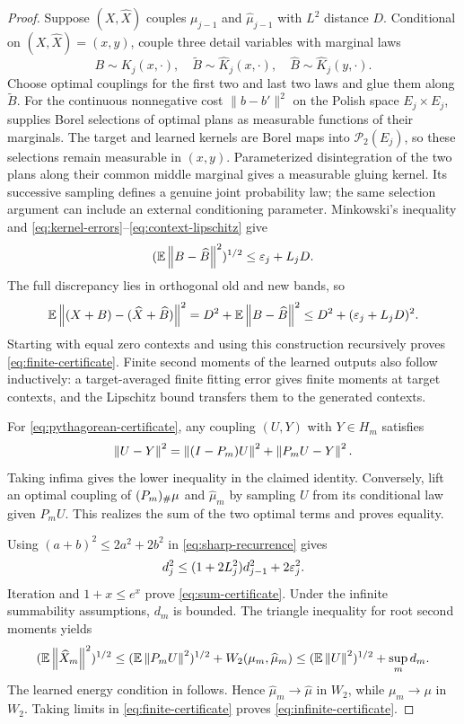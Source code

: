 \begin{proof}
Suppose $(X,\widehat X)$ couples $\mu_{j-1}$ and $\widehat\mu_{j-1}$ with $L^2$ distance $D$. Conditional on $(X,\widehat X)=(x,y)$, couple three detail variables with marginal laws
\[
 B\sim K_j(x,\cdot),\quad
 \widetilde B\sim\widehat K_j(x,\cdot),\quad
 \widehat B\sim\widehat K_j(y,\cdot).
\]
Choose optimal couplings for the first two and last two laws and glue them along $\widetilde B$. For the continuous nonnegative cost $\|b-b'\|^2$ on the Polish space $E_j\times E_j$, \citet[Corollary~5.22]{villani2009} supplies Borel selections of optimal plans as measurable functions of their marginals. The target and learned kernels are Borel maps into $\mathcal P_2(E_j)$, so these selections remain measurable in $(x,y)$. Parameterized disintegration of the two plans along their common middle marginal gives a measurable gluing kernel. Its successive sampling defines a genuine joint probability law; the same selection argument can include an external conditioning parameter. Minkowski's inequality and \eqref{eq:kernel-errors}--\eqref{eq:context-lipschitz} give
\begin{equation}\label{eq:detail-coupling-bound}
 (\mathbb E\left\lVert B-\widehat B\right\rVert^2)^{1/2}
 \le\varepsilon_j+L_jD.
\end{equation}
The full discrepancy lies in orthogonal old and new bands, so
\[
 \mathbb E\left\lVert(X+B)-(\widehat X+\widehat B)\right\rVert^2
 =D^2+\mathbb E\left\lVert B-\widehat B\right\rVert^2
 \le D^2+(\varepsilon_j+L_jD)^2.
\]
Starting with equal zero contexts and using this construction recursively proves \eqref{eq:finite-certificate}. Finite second moments of the learned outputs also follow inductively: a target-averaged finite fitting error gives finite moments at target contexts, and the Lipschitz bound transfers them to the generated contexts.

For \eqref{eq:pythagorean-certificate}, any coupling $(U,Y)$ with $Y\in H_m$ satisfies
\[
 \left\lVert U-Y\right\rVert^2=\left\lVert(I-P_m)U\right\rVert^2+\left\lVert P_mU-Y\right\rVert^2.
\]
Taking infima gives the lower inequality in the claimed identity. Conversely, lift an optimal coupling of $(P_m)_{\#}\mu$ and $\widehat\mu_m$ by sampling $U$ from its conditional law given $P_mU$. This realizes the sum of the two optimal terms and proves equality.

Using $(a+b)^2\le2a^2+2b^2$ in \eqref{eq:sharp-recurrence} gives
\[
 d_j^2\le(1+2L_j^2)d_{j-1}^2+2\varepsilon_j^2.
\]
Iteration and $1+x\le e^x$ prove \eqref{eq:sum-certificate}. Under the infinite summability assumptions, $d_m$ is bounded. The triangle inequality for root second moments yields
\[
 (\mathbb E\left\lVert\widehat X_m\right\rVert^2)^{1/2}
 \le (\mathbb E\left\lVert P_mU\right\rVert^2)^{1/2}+W_2(\mu_m,\widehat\mu_m)
 \le(\mathbb E\left\lVert U\right\rVert^2)^{1/2}+\sup_m d_m.
\]
The learned energy condition in  follows. Hence $\widehat\mu_m\to\widehat\mu$ in $W_2$, while $\mu_m\to\mu$ in $W_2$. Taking limits in \eqref{eq:finite-certificate} proves \eqref{eq:infinite-certificate}.
\end{proof}


